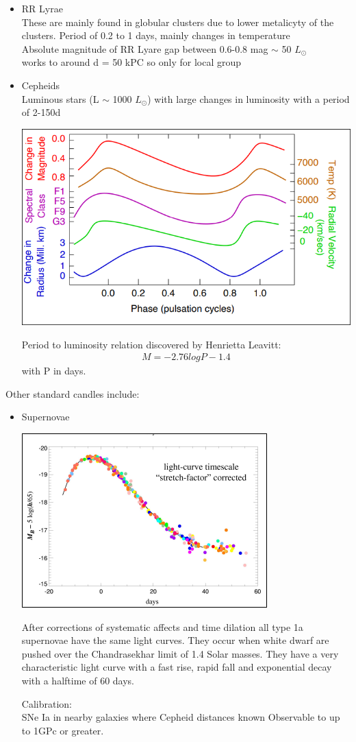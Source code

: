 \documentclass[11pt,a4paper]{article}
\begin{document}
\begin{itemize}
    \item RR Lyrae\\ 
        These are mainly found in globular clusters due to lower metalicyty of the clusters.
        Period of 0.2 to 1 days, mainly changes in temperature\\ 
        Absolute magnitude of RR Lyare gap between 0.6-0.8 mag $\sim$ 50 $L_\odot$ \\
        works to around d = 50 kPC so only for local group
    \item Cepheids \\ 
        Luminous stars (L $\sim$ 1000 $L_\odot$) with large changes in luminosity with a period of 2-150d
\begin{center}
    \includegraphics[width=0.5\linewidth]{screenshot_2024-01-23-113927.png}
\end{center}
    Period to luminosity relation discovered by Henrietta Leavitt: 
     \begin{align*}
       M = -2.76 log P - 1.4 
     \end{align*}
     with P in days.
\end{itemize}
Other standard candles include: 
\begin{itemize}
    \item Supernovae 
\begin{center}
    \includegraphics[width=0.5\linewidth]{screenshot_2024-01-23-114223.png}
\end{center}
After corrections of systematic affects and time dilation all type 1a supernovae have the same light curves.
They occur when white dwarf are pushed over the Chandrasekhar limit of 1.4 Solar masses.
They have a very characteristic light curve with a fast rise, rapid fall and exponential decay with a halftime of 60 days.

Calibration: \\SNe Ia in nearby galaxies where Cepheid distances known
Observable to up to 1GPc or greater.
\end{itemize}
\end{document}
